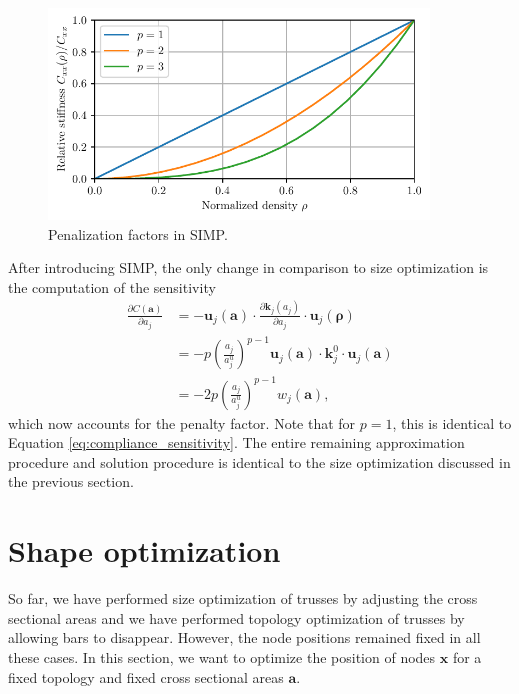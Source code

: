 \begin{figure}[!htpb]
    \centering
    \includegraphics[width=0.9\textwidth]{figures/simp.pdf}
    \caption{Penalization factors in SIMP.}
    \label{fig:simp_truss}
\end{figure}

After introducing SIMP, the only change in comparison to size optimization is the computation of the sensitivity
\begin{align}
    \frac{\partial C (\mathbf{a})}{\partial a_j} 
    &= - \mathbf{u}_j (\mathbf{a}) \cdot \frac{\partial \mathbf{k}_j(a_j)}{\partial a_j} \cdot \mathbf{u}_j (\pmb{\rho})  \\
    &= - p \left(\frac{a_j}{a_j^u}\right)^{p-1} \mathbf{u}_j (\mathbf{a}) \cdot \mathbf{k}^0_j \cdot \mathbf{u}_j (\mathbf{a})  \\
    &= - 2 p \left(\frac{a_j}{a_j^u}\right)^{p-1} w_j (\mathbf{a}),
\end{align}
which now accounts for the penalty factor. Note that for $p=1$, this is identical to Equation \eqref{eq:compliance_sensitivity}. 
The entire remaining approximation procedure and solution procedure is identical to the size optimization discussed in the previous section.

\section{Shape optimization}
So far, we have performed size optimization of trusses by adjusting the cross sectional areas and we have performed topology optimization of trusses by allowing bars to disappear. However, the node positions remained fixed in all these cases. 
In this section, we want to optimize the position of nodes $\mathbf{x}$ for a fixed topology and fixed cross sectional areas $\mathbf{a}$.

